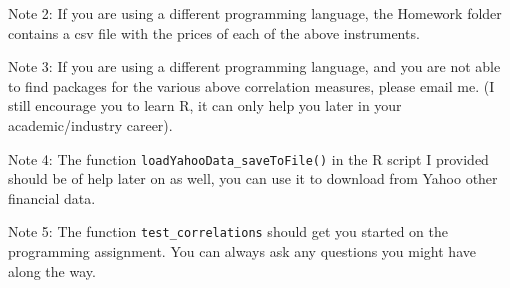 \documentclass[12pt]{article}
\begin{document}
Note 2: If you are using a different programming language, the Homework folder contains a csv file with the prices of each of the above instruments. 

Note 3: If you are using a different programming language, and you are not able to find packages for the various above correlation measures, please email me. (I still encourage you to learn R, it can only help you later in your academic/industry career). 

Note 4: The function \texttt{loadYahooData\_saveToFile()} in the R script I provided should be of help later on as well, you can use it to download from Yahoo other financial data. 

Note 5: The function \texttt{test\_correlations} should get you started on the programming assignment. You can always ask any questions you might have along the way. 
\end{document}
